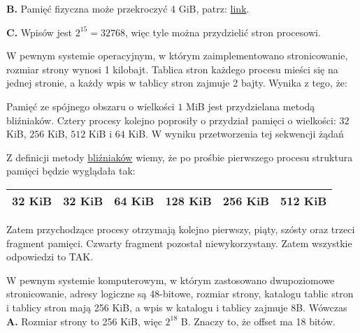 \begin{solutions}
    \textbf{B.} Pamięć fizyczna może przekroczyć 4 GiB, patrz: \href{https://pl.m.wikipedia.org/wiki/Physical_Address_Extension}{link}.
    
    \textbf{C.} Wpisów jest $2^{15} = 32768$, więc tyle można przydzielić stron procesowi.
    
    \sol W pewnym systemie operacyjnym, w którym zaimplementowano stronicowanie, rozmiar strony wynosi 1 kilobajt. Tablica stron każdego procesu mieści się na jednej stronie, a każdy wpis w tablicy stron zajmuje 2 bajty. Wynika z tego, że:

    \sol Pamięć ze spójnego obszaru o wielkości $1$ MiB jest przydzielana metodą bliźniaków. Cztery procesy kolejno poprosiły o przydział pamięci o wielkości: $32$ KiB, $256$ KiB, $512$ KiB i $64$ KiB. W wyniku przetworzenia tej sekwencji żądań

    Z definicji metody \href{https://ocdn.eu/images/pulscms/NzQ7MDA_/c7e85be71d20e087115f0d8465fea342.jpg}{bliźniaków} wiemy, że po prośbie pierwszego procesu struktura pamięci będzie wyglądała tak:
    \begin{center}
        \begin{tabular}{ | c | c | c | c | c | c | } 
            \hline
            32 KiB & 32 KiB & 64 KiB & 128 KiB & 256 KiB & 512 KiB \\
            \hline
        \end{tabular}
    \end{center}
    Zatem przychodzące procesy otrzymają kolejno pierwszy, piąty, szósty oraz trzeci fragment pamięci. Czwarty fragment pozostał niewykorzystany. Zatem wszystkie odpowiedzi to TAK.

    \sol W pewnym systemie komputerowym, w którym zastosowano dwupoziomowe stronicowanie, adresy logiczne są 48-bitowe, rozmiar strony, katalogu tablic stron i tablicy stron mają 256 KiB, a wpis w katalogu i tablicy zajmuje 8B. Wówczas
    \textbf{A.} Rozmiar strony to 256 KiB, więc $2^18$ B. Znaczy to, że offset ma 18 bitów.


\end{solutions}
